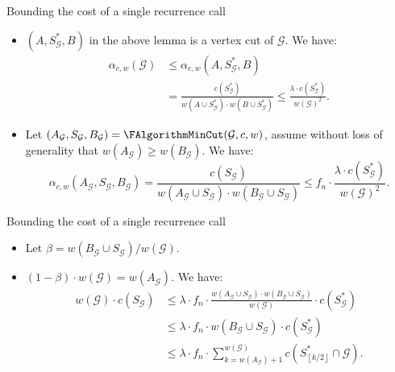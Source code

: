 \documentclass{beamer}
\newcommand{\br}[1]{\mathopen{}\left( #1 \right)}
\newcommand{\fl}[1]{\mathopen{}\left\lfloor #1 \right\rfloor}
\begin{document}
\begin{frame}{Bounding the cost of a single recurrence call}
\begin{itemize}
    \item $\br{A,S_{\mathcal{G}}^*,B}$ in the above lemma is a vertex cut of $\mathcal{G}$. We have:
    \pause
    \begin{align*}
    \alpha_{c,w}\br{\mathcal{G}}&\leq \alpha_{c,w}\br{A,S_{\mathcal{G}}^*,B}
    \\&=
    \frac{c\br{S_{\mathcal{G}}^*}}{w\br{A\cup S_{\mathcal{G}}^*}\cdot w\br{B\cup S_{\mathcal{G}}^*}}\leq \frac{\lambda\cdot c\br{S_{\mathcal{G}}^*}}{w\br{\mathcal{G}}^2}.   
    \end{align*}
    \pause
    \item Let $\br{A_{\mathcal{G}},S_{\mathcal{G}}, B_{\mathcal{G}}} = \FAlgorithmMinCut \br{\mathcal{G},c,w}$, assume without loss of generality that  $w\br{A_{\mathcal{G}}}\geq w\br{B_{\mathcal{G}}}$. We have:
    \pause
    $$
        \alpha_{c,w}\br{A_{\mathcal{G}},S_{\mathcal{G}}, B_{\mathcal{G}}}=\frac{c\br{S_{\mathcal{G}}}}{w\br{A_{\mathcal{G}}\cup S_{\mathcal{G}}}\cdot w\br{B_{\mathcal{G}}\cup S_{\mathcal{G}}}}\leq f_n \cdot \frac{\lambda\cdot c\br{S_{\mathcal{G}}^*}} {w\br{\mathcal{G}}^2}.
        $$
\end{itemize}
\end{frame}

\begin{frame}{Bounding the cost of a single recurrence call }
\begin{itemize}
    \item Let $\beta=w\br{B_{\mathcal{G}}\cup S_{\mathcal{G}}}/w\br{\mathcal{G}}$.
    \pause
    \item $\br{1-\beta}\cdot w\br{\mathcal{G}} = w\br{A_\mathcal{G}}$. We have:
    \begin{align*}
        w\br{\mathcal{G}}\cdot c\br{S_{\mathcal{G}}} &\leq \lambda \cdot f_n\cdot \frac{w\br{A_{\mathcal{G}}\cup S_{\mathcal{G}}}\cdot w\br{B_{\mathcal{G}}\cup S_{\mathcal{G}}}}{w\br{\mathcal{G}}}\cdot c\br{S_{\mathcal{G}}^*}\\
        & \leq 
        \lambda \cdot f_n\cdot w\br{B_{\mathcal{G}}\cup S_{\mathcal{G}}}\cdot c\br{S_{\mathcal{G}}^*} 
        \\&\leq 
        \lambda \cdot f_n\cdot \sum_{k=w\br{A_{\mathcal{G}}}+1}^{w\br{\mathcal{G}}}c\br{S_{\fl{k/2}}^*\cap \mathcal{G}}.
        \end{align*}
\end{itemize} 
\end{frame}
\end{document}
